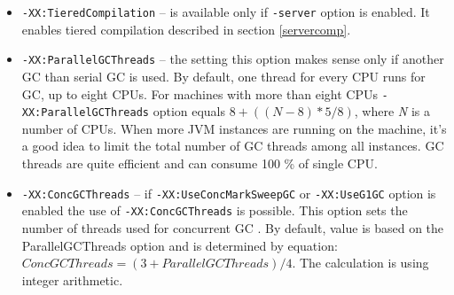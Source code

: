 \documentclass[
  digital, %
  oneside,
  notable, %
  nolof,     %
  nolot     %
]{fithesis3}
\begin{document}
\begin{itemize}
	\item \texttt{-XX:TieredCompilation} -- is available only if \texttt{-server} option is enabled. It enables tiered compilation described in section \ref{servercomp}.
	\item \texttt{-XX:ParallelGCThreads} -- the setting this option makes sense only if another GC than serial GC is used. By default, one thread for every CPU runs for GC, up to eight CPUs. For machines with more than eight CPUs \texttt{-XX:ParallelGCThreads} option equals $8 + ((N - 8) * 5 / 8)$, where \textit{N} is a number of CPUs. When more JVM instances are running on the machine, it's a good idea to limit the total number of GC threads among all instances. GC threads are quite efficient and can consume 100 \% of single CPU.~\cite{scott}
	\item \texttt{-XX:ConcGCThreads} -- if \texttt{-XX:UseConcMarkSweepGC} or \texttt{-XX:Use\-G1GC} option is enabled the use of \texttt{-XX:ConcGCThreads} is possible. This option sets the number of threads used for concurrent GC \cite{java}. By default, value is based on the ParallelGCThreads option and is determined by equation: $ConcGCThreads = (3 + ParallelGCThreads) / 4$. The calculation is using integer arithmetic. \cite{scott}
\end{itemize}
\end{document}
